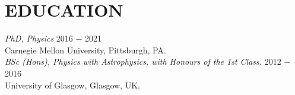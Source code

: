 
\section{\textbf{\color{RoyalBlue}EDUCATION}}

{\sl PhD, Physics}  \hfill  2016 $-$ 2021 \\
Carnegie Mellon University, Pittsburgh, PA. \\

{\sl BSc (Hons), Physics with Astrophysics, with Honours of the 1st Class.}  \hfill  2012 $-$ 2016 \\
University of Glasgow, Glasgow, UK. \\

